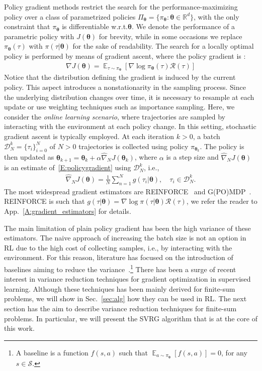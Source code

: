 \documentclass{article}
\makeatletter
\theoremstyle{remark}
\theoremstyle{definition}
\DeclareRobustCommand{\eg}{e.g.,\@\xspace}
\DeclareRobustCommand{\ie}{i.e.,\@\xspace}
\DeclareRobustCommand{\wrt}{w.r.t.\@\xspace}
\newcommand{\realspace}{\mathbb R}      %
\DeclareMathOperator*{\EV}{\mathbb{E}}
\newcommand{\EVV}[2][\ppvect \in \ppspace]{\EV_{#1}\left[{#2}\right]}
\newcommand{\de}{\,\mathrm{d}}
\newcommand{\vtheta}{\boldsymbol{\theta}}
\newcommand{\Sspace}{\mathcal{S}}
\newcommand{\Tspace}{\mathcal{T}}
\newcommand{\Reward}{\mathcal{R}}
\newcommand{\pol}{\pi_{\vtheta}}
\newcommand{\score}[2]{\nabla\log\pi_{#1}(#2)}
\newcommand{\gradJ}[1]{\nabla J(#1)}
\newcommand{\gradApp}[2]{\widehat{\nabla}_{#2}J(#1)}
\makeatother
\begin{document}
Policy gradient methods restrict the search for the performance-maximizing policy over a class of parametrized policies $\Pi_{\vtheta}=\{\pol: \vtheta \in \realspace^d\}$, with the only constraint that $\pol$ is differentiable \wrt $\vtheta$. We denote the performance of a parametric policy with $J(\vtheta)$ for brevity, while in some occasions we replace $\pol(\tau)$ with $\pi(\tau|\vtheta)$ for the sake of readability.
The search for a locally optimal policy is performed by means of gradient ascent, where the policy gradient
is \cite{sutton2000policy, Peters2008reinf}:
\begin{align} \label{E:policygradient}
        \gradJ{\vtheta} = \EVV[\tau \sim \pol]{\score{\vtheta}{\tau}\Reward(\tau)}
\end{align}
Notice that the distribution defining the gradient is induced by the current policy. This aspect introduces a nonstationarity in the sampling process. Since the underlying distribution changes over time, it is necessary to resample at each update or use weighting techniques such as importance sampling.
Here, we consider the \emph{online learning scenario}, where trajectories are sampled by interacting with the environment at each policy change. 
In this setting, stochastic gradient ascent is typically employed.
At each iteration $k >0$, a batch $\mathcal{D}_N^k = \{\tau_i\}_{i=0}^N$ of $N>0$ trajectories is collected using policy $\pi_{\vtheta_k}$.
The policy is then updated as $\vtheta_{k+1}  = \vtheta_k + \alpha\gradApp{\vtheta_k}{N}$, where $\alpha$ is a step size and $\gradApp{\vtheta}{N}$ is an estimate of~\eqref{E:policygradient} using $\mathcal{D}_N^k$, \ie
\begin{align} \label{E:policygradient.estimate}
        \gradApp{\vtheta}{N} = \frac{1}{N}\sum_{n=1}^{N} g(\tau_i|\vtheta), \quad \tau_i \in \mathcal{D}_N^k.
\end{align}
The most widespread gradient estimators are REINFORCE~\citep{williams1992simple} and G(PO)MDP~\citep{baxter2001infinite}.
REINFORCE is such that $g(\tau|\vtheta) = \nabla \log\pi(\tau|\vtheta) \mathcal{R}(\tau)$,  we refer the reader to App.~\ref{A:gradient_estimators} for details.

The main limitation of plain policy gradient has been the high variance of these estimators.
The naive approach of increasing the batch size is not an option in RL due to the high cost of collecting samples, \ie by interacting with the environment.
For this reason, literature has focused on the introduction of baselines aiming to reduce the variance~\citep[\eg][]{Peters2008reinf,Thomas2017actionbaseline,wu2018variance}.\footnote{A baseline is a function $f(s,a)$ such that $\EVV[a \sim \pol]{f(s,a)} = 0$, for any $s\in\Sspace$.}
There has been a surge of recent interest in variance reduction techniques for gradient optimization in supervised learning.
Although these techniques has been mainly derived for finite-sum problems, we will show in Sec.~\ref{sec:alg} how they can be used in RL.
The next section has the aim to describe variance reduction techniques for finite-sum problems. In particular, we will present the SVRG algorithm that is at the core of this work.
\end{document}
